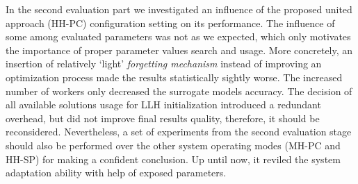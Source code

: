 In the second evaluation part we investigated an influence of the proposed united approach (HH-PC) configuration setting on its performance. The influence of some among evaluated parameters was not as we expected, which only motivates the importance of proper parameter values search and usage. More concretely, an insertion of relatively `light' \emph{forgetting mechanism} instead of improving an optimization process made the results statistically sightly worse. The increased number of workers only decreased the surrogate models accuracy. The decision of all available solutions usage for LLH initialization introduced a redundant overhead, but did not improve final results quality, therefore, it should be reconsidered. Nevertheless, a set of experiments from the second evaluation stage should also be performed over the other system operating modes (MH-PC and HH-SP) for making a confident conclusion. Up until now, it reviled the system adaptation ability with help of exposed parameters.
